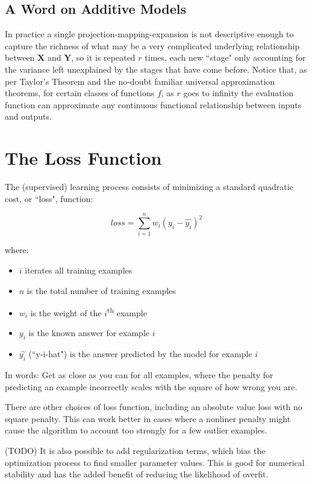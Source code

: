 \documentclass[12pt]{article}
\begin{document}
\subsection{A Word on Additive Models}

In practice a single projection-mapping-expansion is not descriptive enough to capture the richness of what may be a very complicated underlying relationship between $\pmb{X}$ and $\pmb{Y}$, so it is repeated $r$ times, each new ``stage" only accounting for the variance left unexplained by the stages that have come before. Notice that, as per Taylor's Theorem and the no-doubt familiar universal approximation theorems, for certain classes of functions $f$, as $r$ goes to infinity the evaluation function can approximate any continuous functional relationship between inputs and outputs.

\section{The Loss Function}

The (supervised) learning process consists of minimizing a standard quadratic cost, or ``loss", function:

$$loss = \sum_{i=1}^n w_i (y_i - \hat{y_i})^2$$

where:
\begin{itemize}
	\setlength\itemsep{-2mm}
	\item $i$ iterates all training examples
	\item $n$ is the total number of training examples
	\item $w_i$ is the weight of the $i$\textsuperscript{th} example
	\item $y_i$ is the known answer for example $i$
	\item $\hat{y_i}$ (``y-i-hat") is the answer predicted by the model for example $i$
\end{itemize}

In words: Get as close as you can for all examples, where the penalty for predicting an example incorrectly scales with the square of how wrong you are.

There are other choices of loss function, including an absolute value loss with no square penalty. This can work better in cases where a nonliner penalty might cause the algorithm to account too strongly for a few outlier examples.

(TODO) It is also possible to add regularization terms, which bias the optimization process to find smaller parameter values. This is good for numerical stability and has the added benefit of reducing the likelihood of overfit.
\end{document}
